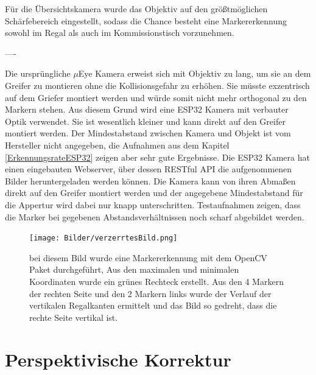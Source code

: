     Für die Übersichtskamera wurde das Objektiv auf den größtmöglichen Schärfebereich eingestellt, sodass die Chance besteht eine Markererkennung sowohl im Regal als auch im Kommissionstisch vorzunehmen. 

    ----

    Die ursprüngliche $\mu$Eye Kamera erweist sich mit Objektiv zu lang, um sie an dem Greifer zu montieren ohne die Kollisionsgefahr zu erhöhen. 
    Sie müsste exzentrisch auf dem Griefer montiert werden und würde somit nicht mehr orthogonal zu den Markern stehen.
    Aus diesem Grund wird eine ESP32 Kamera mit verbauter Optik verwendet.
    Sie ist wesentlich kleiner und kann direkt auf den Greifer montiert werden.
    Der Mindestabstand zwischen Kamera und Objekt ist vom Hersteller nicht angegeben, die Aufnahmen aus dem Kapitel \ref{ErkennungsrateESP32} 
    zeigen aber sehr gute Ergebnisse.
    Die ESP32 Kamera hat einen eingebauten Webserver, über dessen RESTful API die aufgenommenen Bilder heruntergeladen werden können. 
    Die Kamera kann von ihren Abmaßen direkt auf den Greifer montiert werden und der angegebene Mindestabstand für die Appertur wird dabei nur knapp unterschritten. 
    Testaufnahmen zeigen, dass die Marker bei gegebenen Abstandsverhältnissen noch scharf abgebildet werden. 

    \begin{figure}
        \caption[Optische Verzerrung der Übersichtskamera]
        {\small bei diesem Bild wurde eine Markererkennung mit dem OpenCV Paket durchgeführt, Aus den maximalen und minimalen Koordinaten wurde ein grünes Rechteck erstellt. Aus den 4 Markern der rechten Seite und den 2 Markern links wurde der Verlauf der vertikalen Regalkanten ermittelt und das Bild so gedreht, dass die rechte Seite vertikal ist.}\label{fig:figure10}
        \texttt{[image: Bilder/verzerrtesBild.png]}
        \centering
    \end{figure}

    \section {Perspektivische Korrektur}

